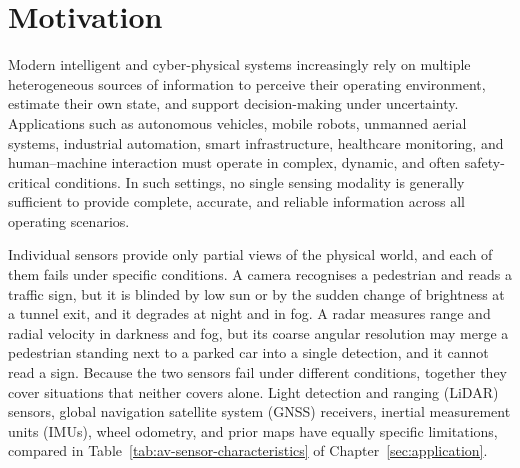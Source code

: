 \documentclass[graybox,envcountchap]{style/SNmono}
\begin{document}
\suppressfloats[t]

\section{Motivation}

Modern intelligent and cyber-physical systems increasingly rely on multiple heterogeneous sources of information to perceive their operating environment, estimate their own state, and support decision-making under uncertainty. Applications such as autonomous vehicles, mobile robots, unmanned aerial systems, industrial automation, smart infrastructure, healthcare monitoring, and human--machine interaction must operate in complex, dynamic, and often safety-critical conditions. In such settings, no single sensing modality is generally sufficient to provide complete, accurate, and reliable information across all operating scenarios.

Individual sensors provide only partial views of the physical world, and each of them fails under specific conditions. A camera recognises a pedestrian and reads a traffic sign, but it is blinded by low sun or by the sudden change of brightness at a tunnel exit, and it degrades at night and in fog. A radar measures range and radial velocity in darkness and fog, but its coarse angular resolution may merge a pedestrian standing next to a parked car into a single detection, and it cannot read a sign. Because the two sensors fail under different conditions, together they cover situations that neither covers alone. Light detection and ranging (LiDAR) sensors, global navigation satellite system (GNSS) receivers, inertial measurement units (IMUs), wheel odometry, and prior maps have equally specific limitations, compared in Table~\ref{tab:av-sensor-characteristics} of Chapter~\ref{sec:application}.
\end{document}
